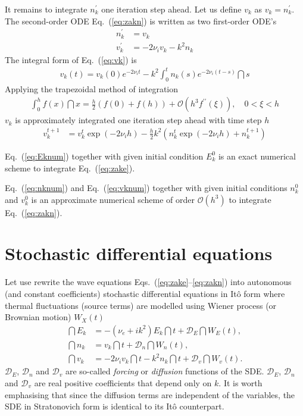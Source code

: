 \documentclass[10pt,a4paper]{article}
\newcommand{\eq}[1]{Eq.~(#1)}
\newcommand{\eqs}[1]{Eqs.~(#1)}
\newcommand{\src}{\ensuremath{\mathcal{D}}}
\begin{document}
It remains to integrate $n_k^\prime$ one iteration step ahead. Let us 
define $v_k$ as $v_k=n_k^\prime$. The second-order ODE \eq{\ref{eq:zakn}} is written
as two first-order ODE's
\begin{align}
n_k^\prime &= v_k\\
v_k^\prime &= -2\nu_iv_k-k^2n_k \label{eq:vk}
\end{align}
The integral form of \eq{\ref{eq:vk}} is
\begin{align}
v_k(t)=v_k(0)e^{-2\nu_it}-k^2\int_0^tn_k(s)e^{-2\nu_i(t{-}s)}\dint{s}
\end{align}
Applying the trapezoidal method of integration
\begin{align}
\int_0^hf(x)\dint{x}=\frac{h}{2}\left(f(0)+f(h)\right)+\mathcal{O}(h^3f^{\prime\prime}(\xi)),
\quad 0<\xi<h
\end{align}
$v_k$ is approximately integrated one iteration step ahead with time step $h$ 
\begin{align}
v_k^{t+1} &= v_k^t\exp\left(-2\nu_ih\right)-\frac{h}{2}k^2
\left(n_k^t\exp\left(-2\nu_ih\right)+n_k^{t+1}\right)
\label{eq:vknum}
\end{align}

\eq{\ref{eq:Eknum}} together with given initial condition $E_k^0$ is an exact numerical scheme
to integrate \eq{\ref{eq:zake}}. 

\eq{\ref{eq:nknum}} and \eq{\ref{eq:vknum}} together with given initial conditions $n_k^0$ and 
$v_k^0$ is an approximate numerical scheme of order $\mathcal{O}(h^3)$ to integrate
\eq{\ref{eq:zakn}}.

\section{Stochastic differential equations}

Let use rewrite the wave equations \eqs{\ref{eq:zake}--\ref{eq:zakn}} into autonomous 
(and constant coefficients) stochastic differential equations in Itô form where thermal
fluctuations (source terms) are modelled using Wiener process (or Brownian motion) $W_X(t)$
\begin{align}
\dint{E_k}&=-(\nu_e+ik^2)E_k\dint{t}+\src_E\dint{W_E(t)}, \label{eq:sdeE}\\
\dint{n_k}&=v_k\dint{t}+\src_n\dint{W_n(t)}, \label{eq:sde20}\\
\dint{v_k}&=-2\nu_i v_k\dint{t}-k^2n_k\dint{t}+\src_v\dint{W_v(t)}. \label{eq:sde21}
\end{align}
$\src_E$, $\src_n$ and $\src_v$ are so-called \emph{forcing} or \emph{diffusion} functions  
of the SDE. $\src_E$, $\src_n$ and $\src_v$ are real positive coefficients that depend only on $k$.
It is worth emphasising that since the diffusion terms are independent of the variables, 
the SDE in Stratonovich form is identical to its Itô counterpart.
\end{document}
